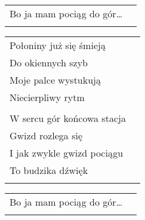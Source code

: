 \documentclass[a5paper]{article}
\begin{document}
\noindent
\begin{tabular}{@{}p{7.50cm}p{3cm}@{}}
Bo ja mam pociąg do gór… \\ \\
\end{tabular}

\noindent
\begin{tabular}{@{}p{7.50cm}p{3cm}@{}}
Połoniny już się śmieją \\
Do okiennych szyb \\
Moje palce wystukują \\
Niecierpliwy rytm \\ \\

W sercu gór końcowa stacja \\
Gwizd rozlega się \\
I jak zwykle gwizd pociągu \\
To budzika dźwięk \\ \\
\end{tabular}

\noindent
\begin{tabular}{@{}p{7.50cm}p{3cm}@{}}
Bo ja mam pociąg do gór… \\ \\
\end{tabular}
\end{document}
